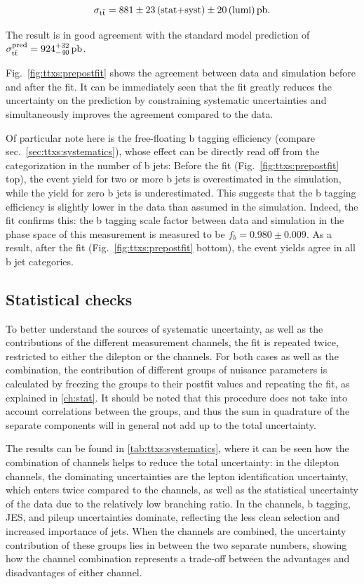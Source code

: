 \[
    \sigma_{\mathrm{t \bar{t}}} = 881 \pm 23 \, \text{(stat+syst)} \pm 20 \, \text{(lumi)} \, \text{pb}.
\]

The result is in good agreement with the standard model prediction of $\sigma_{\mathrm{t \bar{t}}}^{\text{pred}} = 924^{+32}_{-40} \, \text{pb}$.

Fig.~\ref{fig:ttxs:prepostfit} shows the agreement between data and simulation before and after the fit. It can be immediately seen that the fit greatly reduces the uncertainty on the prediction by constraining systematic uncertainties and simultaneously improves the agreement compared to the data. 

Of particular note here is the free-floating b tagging efficiency (compare sec.~\ref{sec:ttxs:systematics}), whose effect can be directly read off from the categorization in the number of b jets: Before the fit (Fig.~\ref{fig:ttxs:prepostfit} top), the event yield for two or more b jets is overestimated in the simulation, while the yield for zero b jets is underestimated. This suggests that the b tagging efficiency is slightly lower in the data than assumed in the simulation. Indeed, the fit confirms this: the b tagging scale factor between data and simulation in the phase space of this measurement is measured to be $f_b  = 0.980 \pm 0.009$. As a result, after the fit (Fig.~\ref{fig:ttxs:prepostfit} bottom), the event yields agree in all b jet categories.

\subsection{Statistical checks}

To better understand the sources of systematic uncertainty, as well as the contributions of the different measurement channels, the fit is repeated twice, restricted to either the dilepton or the \ljets channels. For both cases as well as the combination, the contribution of different groups of nuisance parameters is calculated by freezing the groups to their postfit values and repeating the fit, as explained in \cref{ch:stat}. It should be noted that this procedure does not take into account correlations between the groups, and thus the sum in quadrature of the separate components will in general not add up to the total uncertainty.

The results can be found in \cref{tab:ttxs:systematics}, where it can be seen how the combination of channels helps to reduce the total uncertainty: in the dilepton channels, the dominating uncertainties are the lepton identification uncertainty, which enters twice compared to the \ljets channels, as well as the statistical uncertainty of the data due to the relatively low branching ratio. In the \ljets channels, b tagging, JES, and pileup uncertainties dominate, reflecting the less clean selection and increased importance of jets. When the channels are combined, the uncertainty contribution of these groups lies in between the two separate numbers, showing how the channel combination represents a trade-off between the advantages and disadvantages of either channel.

